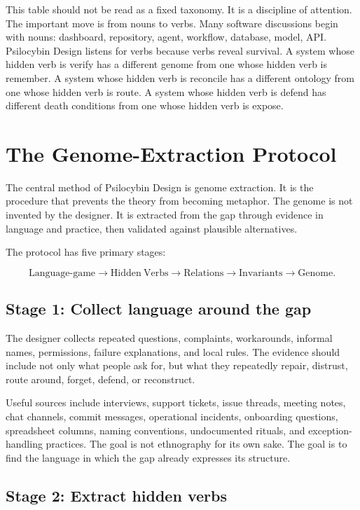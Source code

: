 \documentclass[11pt]{article}
\begin{document}
This table should not be read as a fixed taxonomy. It is a discipline of attention. The important move is from nouns to verbs. Many software discussions begin with nouns: dashboard, repository, agent, workflow, database, model, API. Psilocybin Design listens for verbs because verbs reveal survival. A system whose hidden verb is verify has a different genome from one whose hidden verb is remember. A system whose hidden verb is reconcile has a different ontology from one whose hidden verb is route. A system whose hidden verb is defend has different death conditions from one whose hidden verb is expose.

\section{The Genome-Extraction Protocol}

The central method of Psilocybin Design is genome extraction. It is the procedure that prevents the theory from becoming metaphor. The genome is not invented by the designer. It is extracted from the gap through evidence in language and practice, then validated against plausible alternatives.

The protocol has five primary stages:

\[
    \mathrm{Language\mbox{-}game} \rightarrow \mathrm{Hidden\ Verbs} \rightarrow \mathrm{Relations} \rightarrow \mathrm{Invariants} \rightarrow \mathrm{Genome}.
\]

\subsection{Stage 1: Collect language around the gap}

The designer collects repeated questions, complaints, workarounds, informal names, permissions, failure explanations, and local rules. The evidence should include not only what people ask for, but what they repeatedly repair, distrust, route around, forget, defend, or reconstruct.

Useful sources include interviews, support tickets, issue threads, meeting notes, chat channels, commit messages, operational incidents, onboarding questions, spreadsheet columns, naming conventions, undocumented rituals, and exception-handling practices. The goal is not ethnography for its own sake. The goal is to find the language in which the gap already expresses its structure.

\subsection{Stage 2: Extract hidden verbs}
\end{document}
